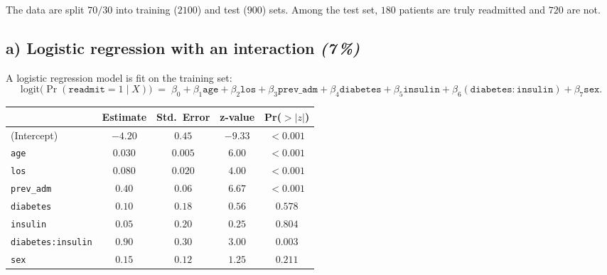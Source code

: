 \documentclass[11pt,a4paper]{article}
\newcommand{\subpoints}[1]{\textit{(#1\,\%)}}
\begin{document}
The data are split $70/30$ into training ($2100$) and test ($900$) sets. Among the test set, $180$ patients are truly readmitted and $720$ are not.

\subsection*{a) Logistic regression with an interaction \subpoints{7}}

A logistic regression model is fit on the training set:
$$\text{logit}\bigl(\Pr(\texttt{readmit} = 1 \mid X)\bigr) \;=\; \beta_0 + \beta_1 \texttt{age} + \beta_2 \texttt{los} + \beta_3 \texttt{prev\_adm} + \beta_4 \texttt{diabetes} + \beta_5 \texttt{insulin} + \beta_6 (\texttt{diabetes}\!:\!\texttt{insulin}) + \beta_7 \texttt{sex}.$$

\begin{center}\small
\begin{tabular}{lcccc}
\toprule
 & \textbf{Estimate} & \textbf{Std.\ Error} & \textbf{z-value} & \textbf{Pr($>|z|$)} \\
\midrule
(Intercept)            & $-4.20$   & $0.45$    & $-9.33$   & $<0.001$ \\
\texttt{age}           & $0.030$   & $0.005$   & $6.00$    & $<0.001$ \\
\texttt{los}           & $0.080$   & $0.020$   & $4.00$    & $<0.001$ \\
\texttt{prev\_adm}     & $0.40$    & $0.06$    & $6.67$    & $<0.001$ \\
\texttt{diabetes}      & $0.10$    & $0.18$    & $0.56$    & $0.578$  \\
\texttt{insulin}       & $0.05$    & $0.20$    & $0.25$    & $0.804$  \\
\texttt{diabetes:insulin} & $0.90$ & $0.30$    & $3.00$    & $0.003$  \\
\texttt{sex}           & $0.15$    & $0.12$    & $1.25$    & $0.211$  \\
\bottomrule
\end{tabular}
\end{center}
\end{document}

